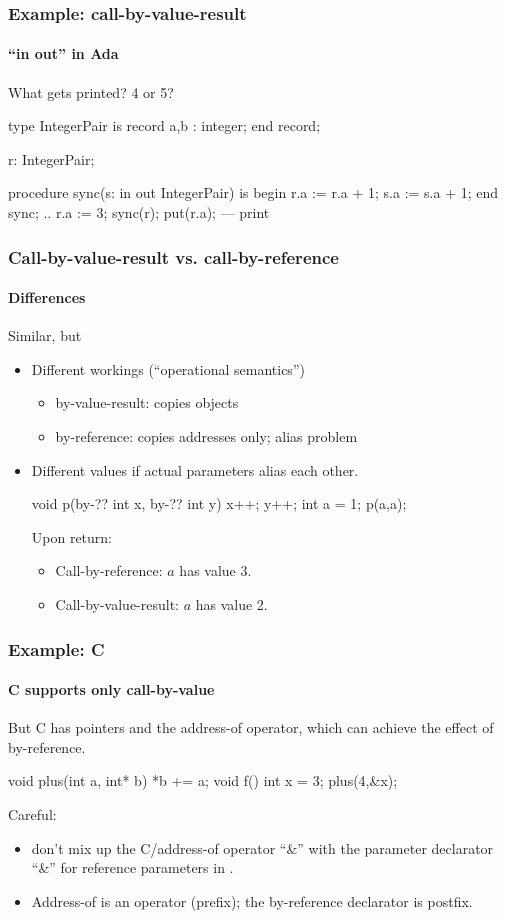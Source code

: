 \documentclass{beamer}
\begin{document}
\begin{frame}[fragile]
\frametitle{Example: call-by-value-result}
\framesubtitle{``in out'' in Ada}

What gets printed? 4 or 5? 
\begin{cplus}
type IntegerPair is 
record
   a,b : integer;
end record;

r: IntegerPair; 

procedure sync(s: in out IntegerPair) is
begin
   r.a := r.a + 1;
   s.a := s.a + 1;
end sync;
..
r.a := 3;
sync(r);
put(r.a); --- print 

\end{cplus}
\end{frame}





\begin{frame}[fragile]
\frametitle{Call-by-value-result vs. call-by-reference}
\framesubtitle{Differences}
Similar, but
\begin{itemize}
\item Different workings  (``operational semantics'')
\begin{itemize}
\item by-value-result: copies objects
\item by-reference: copies addresses only; alias problem
\end{itemize}
\item Different values if actual parameters alias each other.
\begin{cplus}
void p(by-?? int x, by-?? int y) { 
   x++; 
   y++; 
}
int a = 1;
p(a,a);
\end{cplus}
Upon return: 
\begin{itemize}
\item 
Call-by-reference: $a$ has value  3. 
\item 
Call-by-value-result: $a$ has value 2.
\end{itemize}
\end{itemize}
\end{frame}





\begin{frame}[fragile]
\frametitle{Example: C}
\framesubtitle{C supports only call-by-value}
But C has pointers and the address-of operator, which can
achieve the effect of by-reference.


\begin{cplus3}
void plus(int a, int* b) { *b += a;}
void f() {
   int x = 3;
   plus(4,&x);
}
\end{cplus3}
Careful:
\begin{itemize}
\item don't mix  up the C/\cpp address-of operator ``\&'' with
the parameter declarator ``\&'' for reference parameters in \cpp.
\item Address-of is an operator (prefix); the by-reference declarator is postfix.
\end{itemize}
\end{frame}
\end{document}
